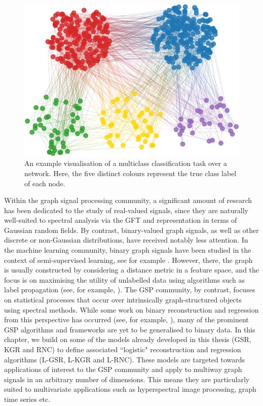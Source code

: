 \begin{figure}[t] 
    \begin{center}
        \includegraphics[width=0.7\linewidth]{Figures/multiclass_graph.pdf}
    \end{center}
   \caption[Visualisation of a multiclass classification task over a network]{An example visualisation of a multiclass classification task over a network. Here, the five distinct colours represent the true class label of each node. } 
    \label{fig:mutliclass_graph}
\end{figure} 

Within the graph signal processing community, a significant amount of research has been dedicated to the study of real-valued signals, since they are naturally well-suited to spectral analysis via the GFT and representation in terms of Gaussian random fields. By contrast, binary-valued graph signals, as well as other discrete or non-Gaussian distributions, have received notably less attention. In the machine learning community, binary graph signals have been studied in the context of semi-supervised learning, see for example \cite{Kondor2002,Zhu2003}. However, there, the graph is usually constructed by considering a distance metric in a feature space, and the focus is on maximising the utility of unlabelled data using algorithms such as label propagation (see, for example, \cite{Zhang2017}). The GSP community, by contrast, focuses on statistical processes that occur over intrinsically graph-structured objects using spectral methods. While some work on binary reconstruction and regression from this perspective has occurred (see, for example, \cite{Tran2020}), many of the prominent GSP algorithms and frameworks are yet to be generalised to binary data. In this chapter, we build on some of the models already developed in this thesis (GSR, KGR and RNC) to define associated ``logistic" reconstruction and regression algorithms (L-GSR, L-KGR and L-RNC). These models are targeted towards applications of interest to the GSP community and apply to multiway graph signals in an arbitrary number of dimensions. This means they are particularly suited to multivariate applications such as hyperspectral image processing, graph time series etc.  

